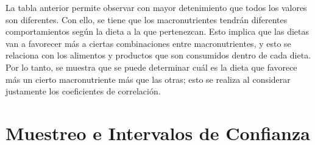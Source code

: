 \documentclass[12pt,a4paper]{article}
\begin{document}
{        La tabla anterior permite observar con mayor detenimiento que todos los valores 
        son diferentes. Con ello, se tiene que 
        los macronutrientes tendrán diferentes comportamientos según la dieta a la que 
        pertenezcan. Esto implica que las dietas van a favorecer más a ciertas combinaciones 
        entre macronutrientes, y esto se relaciona con los alimentos y productos que son 
        consumidos dentro de cada dieta. Por lo tanto, se 
        muestra que se puede determinar cuál es la dieta que favorece más un cierto macronutriente 
        más que las otras; esto se realiza al considerar justamente los coeficientes de correlación.
    }

    \newpage

    \section{Muestreo e Intervalos de Confianza}
\end{document}
